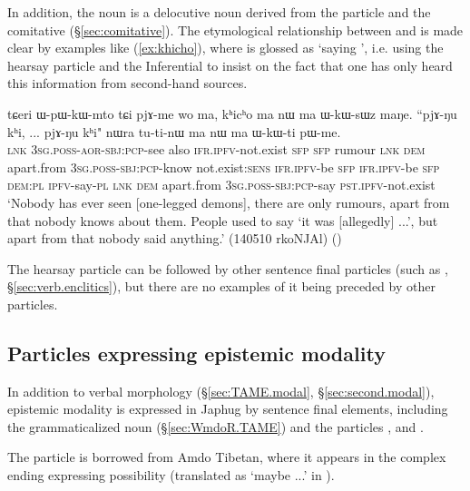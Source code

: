 In addition, the noun  is a delocutive noun derived from the particle  and the comitative  (§\ref{sec:comitative}). The etymological relationship between  and  is made clear by examples like (\ref{ex:khicho}), where  is glossed as `saying ', i.e. using the hearsay particle and the Inferential to insist on the fact that one has only heard this information from second-hand sources.

\begin{exe}
\ex \label{ex:khicho}
\gll  tɕeri ɯ-pɯ-kɯ-mto tɕi pjɤ-me wo ma, kʰicʰo ma nɯ ma ɯ-kɯ-sɯz maŋe. ``pjɤ-ŋu kʰi, ... pjɤ-ŋu kʰi" nɯra tu-ti-nɯ ma nɯ ma ɯ-kɯ-ti pɯ-me. \\
\textsc{lnk} \textsc{3sg}.\textsc{poss}-\textsc{aor}-\textsc{sbj}:\textsc{pcp}-see also \textsc{ifr}.\textsc{ipfv}-not.exist \textsc{sfp} \textsc{sfp} rumour \textsc{lnk} \textsc{dem} apart.from \textsc{3sg}.\textsc{poss}-\textsc{sbj}:\textsc{pcp}-know not.exist:\textsc{sens}  \textsc{ifr}.\textsc{ipfv}-be \textsc{sfp} {   } \textsc{ifr}.\textsc{ipfv}-be \textsc{sfp} \textsc{dem}:\textsc{pl} \textsc{ipfv}-say-\textsc{pl} \textsc{lnk} \textsc{dem} apart.from \textsc{3sg}.\textsc{poss}-\textsc{sbj}:\textsc{pcp}-say \textsc{pst}.\textsc{ipfv}-not.exist \\
\glt `Nobody has ever seen [one-legged demons], there are only rumours, apart from that nobody knows about them. People used to say `it was [allegedly] ...', but apart from that nobody said anything.' (140510 rkoNJAl)
()
 \end{exe}
 
The hearsay particle can be followed by other sentence final particles (such as , §\ref{sec:verb.enclitics}), but there are no examples of it being preceded by other particles.
 
\subsection{Particles expressing epistemic modality} \label{sec:fsp.epistemic}
In addition to verbal morphology (§\ref{sec:TAME.modal}, §\ref{sec:second.modal}), epistemic modality is expressed in Japhug by sentence final elements, including the grammaticalized noun  (§\ref{sec:WmdoR.TAME}) and the particles ,  and .

The particle  is borrowed from Amdo Tibetan, where it appears in the complex ending  expressing possibility (translated as  `maybe ...' in \citealt[306--307]{ebihara19amdo}). 

